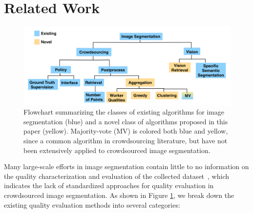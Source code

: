 \section{Related Work\label{sec:related}}
\begin{figure}[h!]
\centering
\includegraphics[width=\linewidth]{plots/flowchart.png}
\caption{Flowchart summarizing the classes of existing algorithms for image segmentation (blue) and a novel class of algorithms proposed in this paper (yellow). Majority-vote (MV) is colored both blue and yellow, since a common algorithm in crowdsourcing literature, but have not been extensively applied to crowdsourced image segmentation.}
\label{flowchart}
\end{figure}
Many large-scale efforts in image segmentation contain little to no information on the quality characterization and evaluation of the collected dataset~\cite{Torralba2010,MartinFTM01,Li2009,Gurari2015}, which indicates the lack of standardized approaches for quality evaluation in crowdsourced image segmentation. As shown in Figure \ref{flowchart}, we break down the existing quality evaluation methods into several categories:
